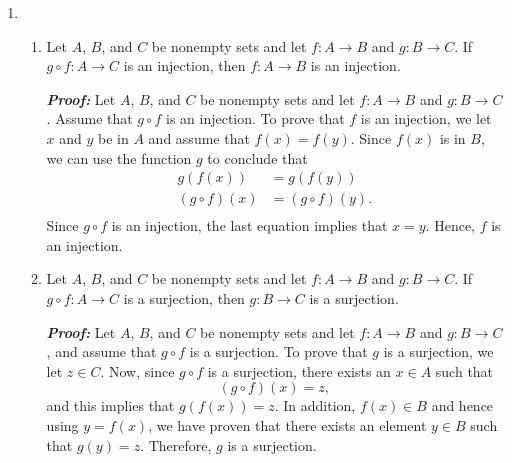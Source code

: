 \begin{enumerate}
\begin{enumerate}
\end{enumerate}



\item \begin{enumerate}
\item Let  $A$, $B$, and  $C$  be nonempty sets and let  $f:A \to B$  and  $g:B \to C$.  If  
$g \circ f:A \to C$  is an injection, then  $f:A \to B$  is an injection.

\textbf{\emph{Proof:}}  Let  $A$, $B$, and  $C$  be nonempty sets and let  $f:A \to B$  and  
$g:B \to C$.  Assume that $g \circ f$ is an injection.  To prove that $f$ is an injection, we let $x$ and $y$ be in $A$ and assume that $f \left( x \right) = f \left( y \right)$.  Since $f \left( x \right)$ is in $B$, we can use the function $g$ to conclude that
\[
\begin{aligned}
g \left( f \left( x \right) \right) &= g \left( f \left( y \right) \right) \\
\left( g \circ f \right) \left( x \right) &= \left( g \circ f \right) \left( y \right). \\
\end{aligned}
\]
Since $g \circ f$ is an injection, the last equation implies that $x = y$. Hence, $f$ is an injection.

\item Let  $A$, $B$, and  $C$  be nonempty sets and let  $f:A \to B$  and  $g:B \to C$.  If  
$g \circ f:A \to C$  is a surjection, then  $g:B \to C$  is a surjection.

\textbf{\emph{Proof:}}  Let  $A$, $B$, and  $C$  be nonempty sets and let  $f:A \to B$  and  
$g:B \to C$, and assume that $g \circ f$ is a surjection.  To prove that $g$ is a surjection, we let $z \in C$.  Now, since $g \circ f$ is a surjection, there exists an $x \in A$ such that
\[
\left( g \circ f \right) \left( x \right) = z,
\]
and this implies that $g \left( f \left( x \right) \right) = z$.  In addition, 
$f \left( x \right) \in B$ and hence using $y = f \left( x \right)$, we have proven that there exists an element $y \in B$ such that $g \left( y \right) = z$.  Therefore, $g$ is a surjection.
\end{enumerate}


\end{enumerate}

\hbreak


\endinput
